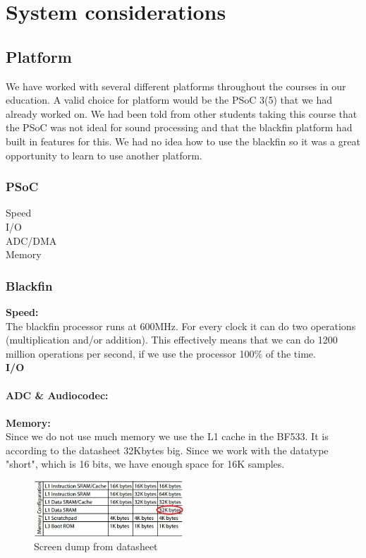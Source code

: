 \chapter{System considerations}
\section{Platform}
We have worked with several different platforms throughout the courses in our education. A valid choice for platform would be the PSoC 3(5) that we had already worked on. We had been told from other students taking this course that the PSoC was not ideal for sound processing and that the blackfin platform had built in features for this. We had no idea how to use the blackfin so it was a great opportunity to learn to use another platform. 
\subsection{PSoC}
Speed\\
I/O\\
ADC/DMA\\
Memory\\
\subsection{Blackfin}
\textbf{Speed:}\\
The blackfin processor runs at 600MHz. For every clock it can do two operations (multiplication and/or addition). This effectively means that we can do 1200 million operations per second, if we use the processor 100\% of the time.\\
\textbf{I/O}\\
\\
\textbf{ADC \& Audiocodec:}\\
\\
\textbf{Memory:}\\
Since we do not use much memory we use the L1 cache in the BF533. It is according to the datasheet 32Kbytes big. Since we work with the datatype "short", which is 16 bits, we have enough space for 16K samples.\\
\begin{figure}[hbpt]
\centering
\includegraphics[width=0.5\textwidth]{billeder/memorytable}
\caption[Screen dump from datasheet]{Screen dump from datasheet\footnotemark}
\label{img:mem_table}
\end{figure}
